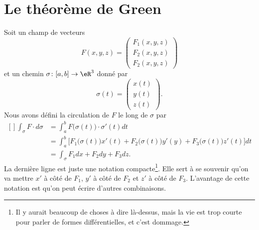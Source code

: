 
\section{Le théorème de Green}

Soit un champ de vecteurs
\begin{equation}
	F(x,y,z)=\begin{pmatrix}
		F_1(x,y,z) \\
		F_2(x,y,z) \\
		F_2(x,y,z)
	\end{pmatrix}
\end{equation}
et un chemin \( \sigma\colon \mathopen[ a , b \mathclose]\to \eR^3\) donné par
\begin{equation}
	\sigma(t)=\begin{pmatrix}
		x(t) \\
		y(t) \\
		z(t)
	\end{pmatrix}.
\end{equation}
Nous avons défini la circulation de \( F\) le long de \( \sigma\) par
\begin{equation}
	\begin{aligned}[]
		\int_{\sigma}F\cdot d\sigma & =\int_a^bF\big( \sigma(t) \big)\cdot\sigma'(t)dt                                                                \\
		                            & =\int_a^b\Big[ F_1\big( \sigma(t) \big)x'(t)+F_2\big( \sigma(t) \big)y'(y)+F_3\big( \sigma(t) \big)z'(t)\Big]dt \\
		                            & =\int_{\sigma} F_1dx +F_2dy+F_3dz.
	\end{aligned}
\end{equation}
La dernière ligne est juste une notation compacte\footnote{Il y aurait beaucoup de choses à dire là-dessus, mais la vie est trop courte pour parler de formes différentielles, et c'est dommage.}. Elle sert à se souvenir qu'on va mettre \( x'\) à côté de \( F_1\), \( y'\) à côté de \( F_2\) et \( z'\) à côté de \( F_3\). L'avantage de cette notation est qu'on peut écrire d'autres combinaisons.

